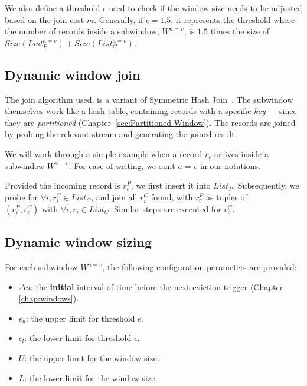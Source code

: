 We also define a threshold $\epsilon$ used to check if the window size needs 
to be adjusted based on the join cost $m$. Generally, if $\epsilon = 1.5$, it represents 
the threshold where the number of records inside a subwindow, $W^{a=v}$, 
is $1.5$ times the size of $Size(List_P^{a=v}) + Size(List_C^{a=v})$.  

\subsection{Dynamic window join}
\label{sub:Dynamic window join}

The join algorithm used, is a variant of Symmetric Hash Join~\cite{symmetric_hash_join}. 
The subwindow themselves work like a hash table, containing records with a 
specific \emph{key} --- since they are \emph{partitioned} (Chapter~\ref{sec:Partitioned Window}). 
The records are joined by probing the relevant stream and generating the 
joined result. 

We will work through a simple example when a record $r_c$ arrives 
inside a subwindow $W^{a=v}$. For ease of writing, we omit $a=v$ in our notations. 


\begin{exmp}    
    Provided the incoming record is $r_c^{P}$, we first insert 
    it into $List_P$. Subsequently, we probe for 
    $\forall i, r_i^C \in List_C$, and join all $r_i^C$ found, with $r_c^P$
    as tuples of $(r_c^P, r_i^C) \text{ with } \forall i, r_i \in List_C$.
    Similar steps are executed for $r_c^C$. 
\end{exmp}





\subsection{Dynamic window sizing}%
\label{sub:Dynamic window sizing}
For each subwindow $W^{a=v}$, the following configuration parameters 
are provided: 

\begin{itemize}
    \item $\Delta n$: the \textbf{initial} interval of time before the next eviction trigger (Chapter \ref{chap:windows}). 
    \item $\epsilon_u$: the upper limit for threshold $\epsilon$.
    \item $\epsilon_l$: the lower limit for threshold $\epsilon$. 
    \item $U$: the upper limit for the window size. 
    \item $L$: the lower limit for the window size. 
\end{itemize}



